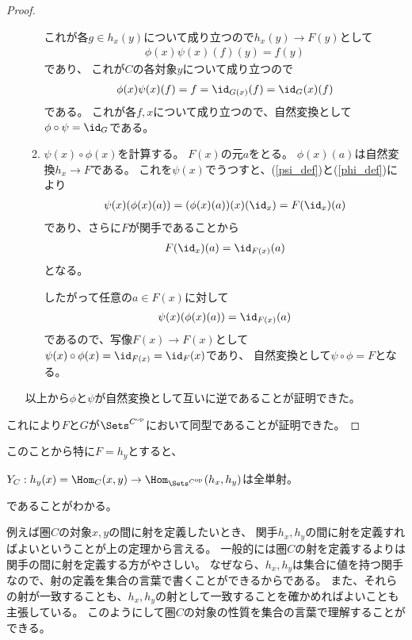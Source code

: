 \documentclass[uplatex]{jsarticle}
\begin{document}
\begin{proof}
\begin{enumerate}
\begin{enumerate}
これが各$g\in h_x(y)$について成り立つので$h_x(y) \to F(y)$として
\begin{align*}
\phi(x)\psi(x)(f)(y)=f(y)
\end{align*}
であり、
これが$C$の各対象$y$について成り立つので
\begin{align*}
\phi(x)\psi(x)(f)=f=\id_{G(x)}(f)=\id_G(x)(f)
\end{align*}
である。
これが各$f, x$について成り立つので、自然変換として$\phi\circ\psi=\id_G$である。

\item $\psi(x)\circ\phi(x)$を計算する。
$F(x)$の元$a$をとる。
$\phi(x)(a)$は自然変換$h_x \to F$である。
これを$\psi(x)$でうつすと、(\ref{psi_def})と(\ref{phi_def})により
\begin{align*}
\psi(x)(\phi(x)(a))=(\phi(x)(a))(x)(\id_x)=F(\id_x)(a)
\end{align*}
であり、さらに$F$が関手であることから
\begin{align*}
F(\id_x)(a)=\id_{F(x)}(a)
\end{align*}
となる。

したがって任意の$a\in F(x)$に対して
\begin{align*}
\psi(x)(\phi(x)(a))=\id_{F(x)}(a)
\end{align*}
であるので、写像$F(x)\to F(x)$として$\psi(x)\circ\phi(x)=\id_{F(x)}=\id_F(x)$であり、
自然変換として$\psi\circ\phi=F$となる。
\end{enumerate}

以上から$\phi$と$\psi$が自然変換として互いに逆であることが証明できた。
\end{enumerate}

これにより$F$と$G$が$\Sets^{C^{\rm op}}$において同型であることが証明できた。
\end{proof}

このことから特に$F=h_y$とすると、
\begin{thm}
$Y_C:h_y(x)=\Hom_C(x,y)\to \Hom_{\Sets^{C^{\rm op}}}(h_x,h_y)$は全単射。
\end{thm}
であることがわかる。

例えば圏$C$の対象$x,y$の間に射を定義したいとき、
関手$h_x, h_y$の間に射を定義すればよいということが上の定理から言える。
一般的には圏$C$の射を定義するよりは関手の間に射を定義する方がやさしい。
なぜなら、$h_x, h_y$は集合に値を持つ関手なので、射の定義を集合の言葉で書くことができるからである。
また、それらの射が一致することも、$h_x, h_y$の射として一致することを確かめればよいことも主張している。
このようにして圏$C$の対象の性質を集合の言葉で理解することができる。
\end{document}
